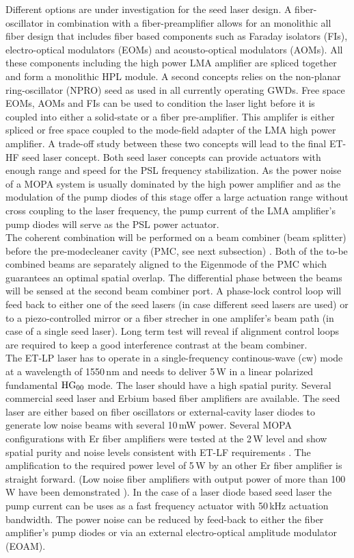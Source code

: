 Different options are under investigation for the seed laser design. A fiber-oscillator in combination with a fiber-preamplifier allows for an monolithic all fiber design that includes fiber based components such as Faraday isolators (FIs), electro-optical modulators (EOMs) and acousto-optical modulators (AOMs). All these components including the high power LMA amplifier are spliced together and form a monolithic HPL module. A second concepts relies on the non-planar ring-oscillator (NPRO) seed as used in all currently operating GWDs. Free space EOMs, AOMs and FIs can be used to condition the laser light before it is coupled into either a solid-state or a fiber pre-amplifier. This amplifer is either spliced or free space coupled to the mode-field adapter of the LMA high power amplifier. A trade-off study between these two concepts will lead to the final ET-HF seed laser concept. Both seed laser concepts can provide  actuators with enough range and speed for the PSL frequency stabilization. As the power noise of a MOPA system is usually dominated by the high power amplifier and as the modulation of the pump diodes of this stage offer a large actuation range without cross coupling to the laser frequency, the pump current of the LMA amplifier's pump diodes will serve as the PSL power actuator.
\\
The coherent combination will be performed on a beam combiner (beam splitter) before the pre-modecleaner cavity (PMC, see next subsection) . Both of the to-be combined beams are separately aligned to the Eigenmode of the PMC which guarantees an optimal spatial overlap. The differential phase between the beams will be sensed at the second beam combiner port. A phase-lock control loop will feed back to either one of the seed lasers (in case different seed lasers are used) or to a piezo-controlled mirror or a fiber strecher in one amplifer's beam path (in case of a single seed laser). Long term test will reveal if alignment control loops are required to keep a good interference contrast at the beam combiner.
\\
The ET-LP laser has to operate in a single-frequency continous-wave (cw) mode at a wavelength of 1550\,nm and needs to deliver 5\,W in a linear polarized fundamental $\rm HG_{00}$ mode. The laser should have a high spatial purity. Several commercial seed laser and Erbium based fiber amplifiers are available. The seed laser are either based on fiber oscillators or external-cavity laser diodes to generate low noise beams with several 10\,mW power. Several MOPA configurations with Er fiber amplifiers were tested at the 2\,W level and show spatial purity and noise levels consistent with ET-LF requirements \cite{meylahn}. The amplification to the required power level of 5\,W by an other Er fiber amplifier is straight forward. (Low noise fiber amplifiers with output power of more than 100\,W have been demonstrated \cite{deVarona}). In the case of a laser diode based seed laser the pump current can be uses as a fast frequency actuator with 50\,kHz actuation bandwidth. The power noise can be reduced by feed-back to either the fiber amplifier's pump diodes or via an external electro-optical amplitude modulator (EOAM).

